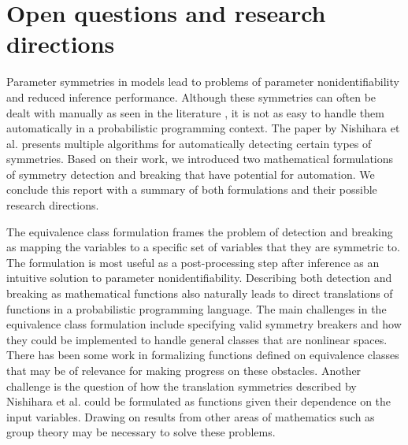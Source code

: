 

\section{Open questions and research directions}

Parameter symmetries in models lead to problems of parameter nonidentifiability and reduced inference performance. Although these symmetries can often be dealt with manually as seen in the literature \cite{Bafumi:2005,Stephens:2000}, it is not as easy to handle them automatically in a probabilistic programming context. The paper by Nishihara et al. \cite{Nishihara:2013} presents multiple algorithms for automatically detecting certain types of symmetries. Based on their work, we introduced two mathematical formulations of symmetry detection and breaking that have potential for automation. We conclude this report with a summary of both formulations and their possible research directions.

The equivalence class formulation frames the problem of detection and breaking as mapping the variables to a specific set of variables that they are symmetric to. The formulation is most useful as a post-processing step after inference as an intuitive solution to parameter nonidentifiability. Describing both detection and breaking as mathematical functions also naturally leads to direct translations of functions in a probabilistic programming language. The main challenges in the equivalence class formulation include specifying valid symmetry breakers and how they could be implemented to handle general classes that are nonlinear spaces. There has been some work in formalizing functions defined on equivalence classes \cite{Paulson:2006} that may be of relevance for making progress on these obstacles. Another challenge is the question of how the translation symmetries described by Nishihara et al. could be formulated as functions given their dependence on the input variables. Drawing on results from other areas of mathematics such as group theory may be necessary to solve these problems.

